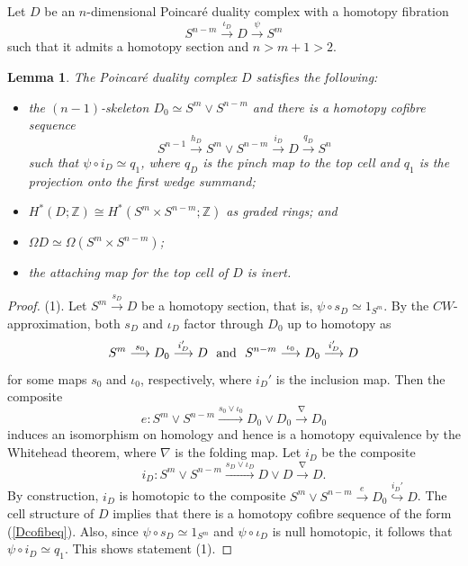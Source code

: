 \documentclass[a4]{amsart}
\newtheorem{lemma}[theorem]{Lemma}
\theoremstyle{definition}
\begin{document}
\begin{sloppypar}
Let $D$ be an $n$-dimensional Poincar\'{e} duality complex with a homotopy fibration
\begin{equation}\label{Dfibeq}
S^{n-m}\stackrel{\iota_D}{\longrightarrow} D\stackrel{\psi}{\longrightarrow} S^m
\end{equation}
such that it admits a homotopy section and $n>m+1> 2$. 
\begin{lemma}\label{Dlemma}
The Poincar\'{e} duality complex $D$ satisfies the following:
\begin{itemize}
\item[(1).] 
the $(n-1)$-skeleton $D_0\simeq S^{m}\vee S^{n-m}$ and there is a homotopy cofibre sequence 
\begin{equation}\label{Dcofibeq}
S^{n-1}\stackrel{h_D}{\longrightarrow} S^{m}\vee S^{n-m}\stackrel{i_D}{\longrightarrow} D \stackrel{q_D}{\longrightarrow} S^n
\end{equation}
such that $\psi\circ i_D\simeq q_1$, where $q_D$ is the pinch map to the top cell and $q_1$ is the projection onto the first wedge summand;  
\item[(2).] 
$H^\ast(D;\mathbb{Z})\cong H^\ast(S^m\times S^{n-m};\mathbb{Z})$ as graded rings; and  
\item[(3).] 
$\Omega D\simeq \Omega (S^m\times S^{n-m})$;
\item[(4).] 
the attaching map for the top cell of $D$ is inert.
\end{itemize}
\end{lemma}
\begin{proof}
(1). Let $S^m\stackrel{s_D}{\longrightarrow} D$ be a homotopy section, that is, $\psi\circ s_D\simeq 1_{S^m}$. By the $CW$-approximation, both $s_D$ and $\iota_D$ factor through $D_0$ up to homotopy as
\[
S^m\stackrel{s_0}{\longrightarrow} D_0 \stackrel{i_D'}{\longrightarrow} D \ \ {\rm and} \ \  
S^{n-m} \stackrel{\iota_0}{\longrightarrow} D_0 \stackrel{i_D'}{\longrightarrow} D 
\]
for some maps $s_0$ and $\iota_0$, respectively, where $i_D'$ is the inclusion map.  
Then the composite 
\[
e: S^m\vee S^{n-m} \stackrel{s_0\vee \iota_0}{\longrightarrow} D_0\vee D_0 \stackrel{\nabla}{\longrightarrow} D_0
\] 
induces an isomorphism on homology and hence is a homotopy equivalence by the Whitehead theorem, where $\nabla$ is the folding map. 
Let $i_D$ be the composite
\[
i_D: S^m\vee S^{n-m} \stackrel{s_D\vee \iota_D}{\longrightarrow} D\vee D \stackrel{\nabla}{\longrightarrow} D.
\] 
By construction, $i_D$ is homotopic to the composite $S^m\vee S^{n-m} \stackrel{e}{\longrightarrow}D_0\stackrel{i_D'}{\hookrightarrow} D$. 
The cell structure of $D$ implies that there is a homotopy cofibre sequence of the form (\ref{Dcofibeq}). 
Also, since $\psi\circ s_D\simeq 1_{S^m}$ and $\psi\circ\iota_D$ is null homotopic, it follows that $\psi \circ i_D\simeq q_1$. This shows statement (1). 


\end{proof}
\end{sloppypar}
\end{document}
